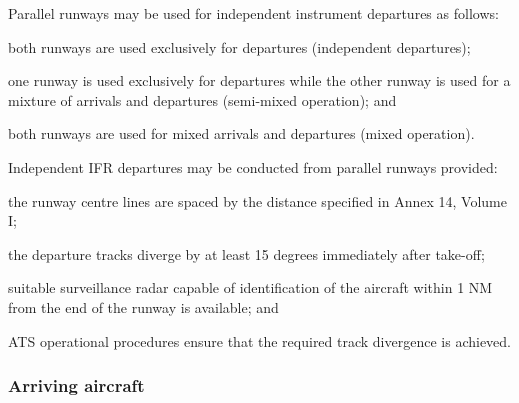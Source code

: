 \begin{enumeratesc}
    \begin{enumempty}
        \item Parallel runways may be used for independent instrument departures as follows:
    \end{enumempty}
    \begin{enumalph}
        \item both runways are used exclusively for departures (independent departures);
        \item one runway is used exclusively for departures while the other runway is used for a mixture of arrivals and departures (semi-mixed operation); and
        \item both runways are used for mixed arrivals and departures (mixed operation).
    \end{enumalph}

     \label{6.7.3.2}
    \begin{enumempty}
        \item Independent IFR departures may be conducted from parallel runways provided:
    \end{enumempty}
    \begin{enumalph}
        \item the runway centre lines are spaced by the distance specified in Annex 14, Volume I;
        \item the departure tracks diverge by at least 15 degrees immediately after take-off;
        \item \label{6.7.3.2.3} suitable surveillance radar capable of identification of the aircraft within 1 NM from the end of the runway is available; and
        \item ATS operational procedures ensure that the required track divergence is achieved.
    \end{enumalph}
\end{enumeratesc}

\subsubsection{Arriving aircraft}

